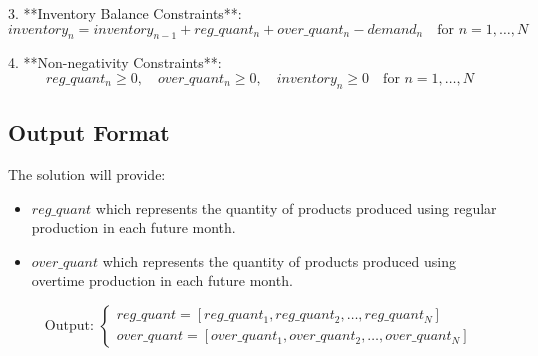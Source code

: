 \documentclass{article}
\begin{document}
3. **Inventory Balance Constraints**:
   \[
   inventory_n = inventory_{n-1} + reg\_quant_n + over\_quant_n - demand_n \quad \text{for } n = 1, \ldots, N
   \]

4. **Non-negativity Constraints**:
   \[
   reg\_quant_n \geq 0, \quad over\_quant_n \geq 0, \quad inventory_n \geq 0 \quad \text{for } n = 1, \ldots, N
   \]

\subsection*{Output Format}

The solution will provide:
\begin{itemize}
    \item \( reg\_quant \) which represents the quantity of products produced using regular production in each future month.
    \item \( over\_quant \) which represents the quantity of products produced using overtime production in each future month.
\end{itemize}

\[
\text{Output: } 
\begin{cases}
    reg\_quant = [reg\_quant_1, reg\_quant_2, \ldots, reg\_quant_N] \\
    over\_quant = [over\_quant_1, over\_quant_2, \ldots, over\_quant_N]
\end{cases}
\]
\end{document}
